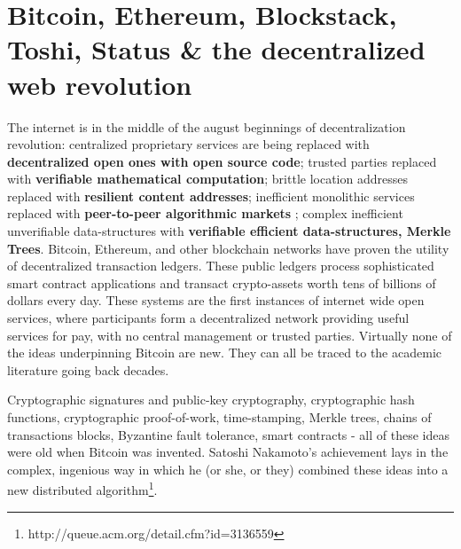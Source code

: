 \documentclass{article}
\begin{document}
\section{Bitcoin, Ethereum, Blockstack, Toshi, Status \& the decentralized web revolution}
 The internet is in the middle of the august beginnings of decentralization revolution: centralized proprietary services are being replaced with \textbf{decentralized open ones with open source code}; trusted parties replaced with \textbf{verifiable mathematical computation}; brittle location addresses replaced with \textbf{resilient content addresses}; inefficient monolithic services replaced with \textbf{peer-to-peer algorithmic markets} ; complex inefficient unverifiable data-structures with \textbf{verifiable efficient data-structures, Merkle Trees}. Bitcoin, Ethereum, and other blockchain networks have proven the utility of decentralized transaction ledgers. These public ledgers process sophisticated smart contract applications and transact crypto-assets worth tens of billions of dollars every day. These systems are the first instances of internet wide open services, where participants form a decentralized network providing useful services for pay, with no central management or trusted parties.
Virtually none of the ideas underpinning Bitcoin are new. They can all be traced to the academic literature going back decades.

 Cryptographic signatures and public-key cryptography, cryptographic hash functions, cryptographic proof-of-work, time-stamping, Merkle trees, chains of transactions blocks, Byzantine fault tolerance, smart contracts - all of these ideas were old when Bitcoin was invented.
 Satoshi Nakamoto's achievement lays in the complex, ingenious way in which he (or she, or they) combined these ideas into a new distributed algorithm\footnote{http://queue.acm.org/detail.cfm?id=3136559}.
 

\end{document}
